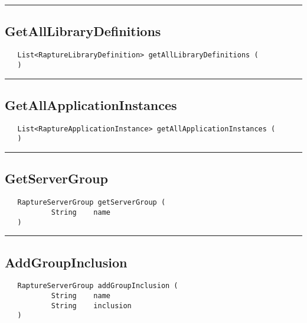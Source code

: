 \rule{15cm}{2pt}
\subsection{GetAllLibraryDefinitions}
\label{Api:GetAllLibraryDefinitions}
\begin{verbatim}
   List<RaptureLibraryDefinition> getAllLibraryDefinitions (
   )
\end{verbatim}



\rule{15cm}{2pt}
\subsection{GetAllApplicationInstances}
\label{Api:GetAllApplicationInstances}
\begin{verbatim}
   List<RaptureApplicationInstance> getAllApplicationInstances (
   )
\end{verbatim}



\rule{15cm}{2pt}
\subsection{GetServerGroup}
\label{Api:GetServerGroup}
\begin{verbatim}
   RaptureServerGroup getServerGroup (
           String    name
   )
\end{verbatim}



\rule{15cm}{2pt}
\subsection{AddGroupInclusion}
\label{Api:AddGroupInclusion}
\begin{verbatim}
   RaptureServerGroup addGroupInclusion (
           String    name
           String    inclusion
   )
\end{verbatim}



